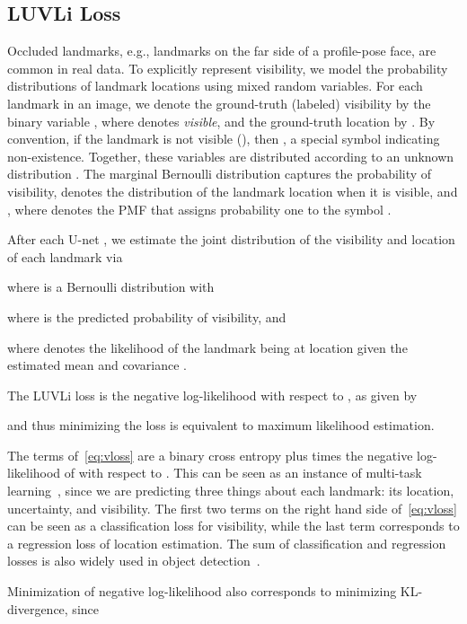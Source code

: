 \documentclass[10pt,twocolumn,letterpaper]{article}
\newcommand{\example}{{e.g.}}
\newcommand{\1}{{\bf 1}}
\newcommand{\0}{{\bf 0}}
\begin{document}
\subsection{LUVLi Loss} \label{sec:loss}
    \vspace{-0.15cm}
        Occluded landmarks, \example, landmarks on the far side of a profile-pose face, are common in real data. To explicitly represent visibility, we model the probability distributions of landmark locations using mixed random variables. For each landmark  in an image, we denote the ground-truth (labeled) visibility by the binary variable , where  denotes {\em visible}, and the ground-truth location by . By convention, if the landmark is not visible (), then , a special symbol indicating non-existence. Together, these variables are distributed according to an unknown distribution . The marginal Bernoulli distribution  captures the probability of visibility,  denotes the distribution of the landmark location when it is visible, and , where  denotes the PMF that assigns probability one to the symbol .
    
         After each U-net , we estimate the joint distribution of the visibility  and location  of each landmark  via
        
        where  is a Bernoulli distribution with
        
        where  is the predicted probability of visibility, and
        
        where  denotes the likelihood of the landmark being at location  given the estimated mean  and covariance .
        
        The LUVLi loss is the negative log-likelihood with respect to , as given by
        
        and thus minimizing the loss is equivalent to maximum likelihood estimation.

        The terms of~\eqref{eq:vloss} are a binary cross entropy plus  times the negative log-likelihood of  with respect to . This can be seen as an instance of multi-task learning~\cite{caruana1997multitask}, since we are predicting three things about each landmark: its location, uncertainty, and visibility. The first two terms on the right hand side of~\eqref{eq:vloss} can be seen as a classification loss for visibility, while the last term corresponds to a regression loss of location estimation.
        The sum of classification and regression losses is also widely used in object detection~\cite{jiao2019survey}.
        
        Minimization of negative log-likelihood also corresponds to minimizing KL-divergence, since
        
\end{document}
